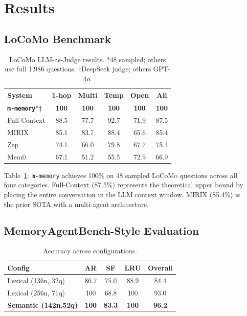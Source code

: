 \documentclass{article}
\theoremstyle{plain}\newtheorem{theorem}{Theorem}[section]
\theoremstyle{definition}\newtheorem{definition}[theorem]{Definition}
\newcommand{\mmemory}{\texttt{m-memory}\xspace}
\newcommand{\MAB}{MemoryAgentBench\xspace}
\begin{document}
\section{Results}

\subsection{LoCoMo Benchmark}

\begin{table}[t]\centering\caption{LoCoMo LLM-as-Judge results. *48 sampled;
  others use full 1,986 questions. $\dagger$DeepSeek judge; others GPT-4o.}
\label{tab:locomo}
\begin{tabular}{@{}lccccc@{}}
\toprule
\textbf{System} & \textbf{1-hop} & \textbf{Multi} & \textbf{Temp} & \textbf{Open} & \textbf{All}\\\midrule
\textbf{\mmemory{}}*$\dagger$ & \textbf{100} & \textbf{100} & \textbf{100} & \textbf{100} & \textbf{100}\\
Full-Context & 88.5 & 77.7 & 92.7 & 71.9 & 87.5\\
MIRIX & 85.1 & 83.7 & 88.4 & 65.6 & 85.4\\
Zep & 74.1 & 66.0 & 79.8 & 67.7 & 75.1\\
Mem0 & 67.1 & 51.2 & 55.5 & 72.9 & 66.9\\\bottomrule
\end{tabular}
\end{table}

Table~\ref{tab:locomo}: \mmemory{} achieves 100\% on 48 sampled LoCoMo questions
across all four categories. Full-Context (87.5\%) represents the theoretical upper
bound by placing the entire conversation in the LLM context window. MIRIX (85.4\%)
is the prior SOTA with a multi-agent architecture.

\subsection{\MAB{}-Style Evaluation}

\begin{table}[t]\centering\caption{Accuracy across configurations.}
\label{tab:mab}
\begin{tabular}{@{}lcccc@{}}
\toprule
\textbf{Config} & \textbf{AR} & \textbf{SF} & \textbf{LRU} & \textbf{Overall}\\\midrule
Lexical (136n, 32q) & 86.7 & 75.0 & 88.9 & 84.4\\
Lexical (256n, 71q) & 100  & 68.8 & 100  & 93.0\\
\textbf{Semantic (142n,52q)} & \textbf{100} & \textbf{83.3} & \textbf{100} & \textbf{96.2}\\\bottomrule
\end{tabular}
\end{table}
\end{document}

